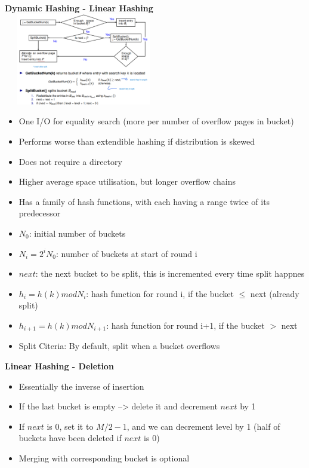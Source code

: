 \documentclass[10pt, landscape]{article}
\begin{document}
\begin{multicols}{4}
\textbf{Dynamic Hashing - Linear Hashing}
\includegraphics[width=7cm, height=4cm]{linear_hash.png}  
\begin{itemize}
  \item One I/O for equality search (more per number of overflow pages in bucket)
  \item Performs worse than extendible hashing if distribution is skewed
  \item Does not require a directory
  \item Higher average space utilisation, but longer overflow chains
  \item Has a family of hash functions, with each having a range twice of its predecessor
  \item $N_0$: initial number of buckets
  \item $N_i = 2^i N_0$: number of buckets at start of round i
  \item $next$: the next bucket to be split, this is incremented every time split happnes
  \item $h_i=h(k) mod N_{i}$: hash function for round i, if the bucket $\leq$ next (already split)
  \item $h_{i+1}=h(k) mod N_{i+1}$: hash function for round i+1, if the bucket $>$ next
  \item Split Citeria: By default, split when a bucket overflows
\end{itemize}

\textbf{Linear Hashing - Deletion}
\begin{itemize}
  \item Essentially the inverse of insertion
  \item If the last bucket is empty --> delete it and decrement $next$ by 1
  \item If $next$ is 0, set it to $M/2 - 1$, and we can decrement level by 1 (half of buckets have been deleted if $next$ is 0)
  \item Merging with corresponding bucket is optional
\end{itemize}

\end{multicols}
\end{document}

